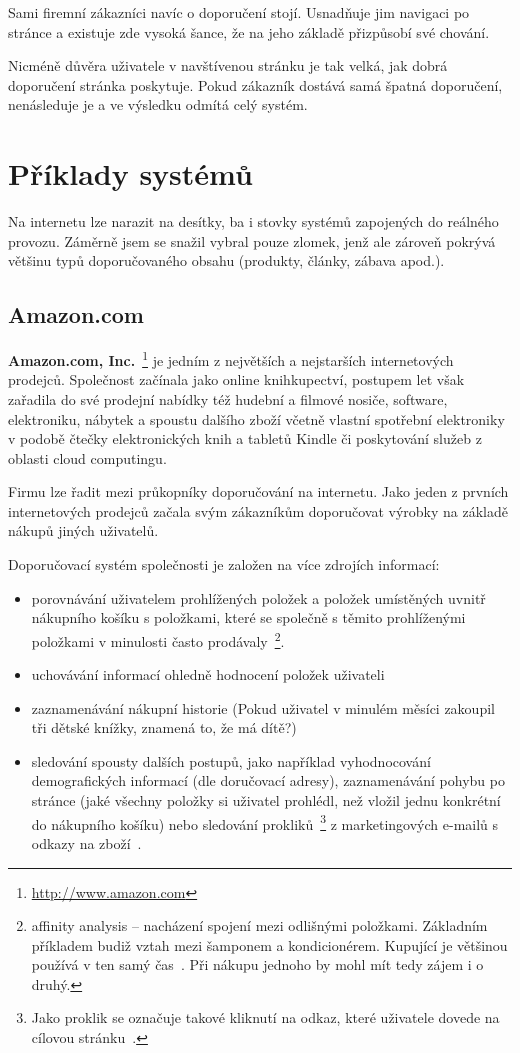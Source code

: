 \documentclass[thesis=M,czech]{FITthesis}[2014/05/07]
\begin{document}
Sami firemní zákazníci navíc o doporučení stojí. Usnadňuje jim navigaci po stránce a existuje zde vysoká šance, že na jeho základě přizpůsobí své chování.

Nicméně důvěra uživatele v navštívenou stránku je tak velká, jak dobrá doporučení stránka poskytuje. Pokud zákazník dostává samá špatná doporučení, nenásleduje je a ve výsledku odmítá celý systém.

\section{Příklady systémů}
\label{sec:examples}
Na internetu lze narazit na desítky, ba i stovky systémů zapojených do reálného provozu. Záměrně jsem se snažil vybral pouze zlomek, jenž ale zároveň pokrývá většinu typů doporučovaného obsahu (produkty, články, zábava apod.).

\subsection{Amazon.com}

\textbf{Amazon.com, Inc.}~\footnote{\url{http://www.amazon.com}} je jedním z největších a nejstarších internetových prodejců. Společnost začínala jako online knihkupectví, postupem let však zařadila do své prodejní nabídky též hudební a filmové nosiče, software, elektroniku, nábytek a spoustu dalšího zboží včetně vlastní spotřební elektroniky v podobě čtečky elektronických knih a tabletů Kindle či poskytování služeb z oblasti cloud computingu.

Firmu lze řadit mezi průkopníky doporučování na internetu. Jako jeden z prvních internetových prodejců začala svým zákazníkům doporučovat výrobky na základě nákupů jiných uživatelů.

Doporučovací systém společnosti je založen na více zdrojích informací:

\begin{itemize}
	\item porovnávání uživatelem prohlížených položek a položek umístěných uvnitř nákupního košíku s položkami, které se společně s těmito prohlíženými položkami v minulosti často prodávaly~\footnote{affinity analysis – nacházení spojení mezi odlišnými položkami. Základním příkladem budiž vztah mezi šamponem a kondicionérem. Kupující je většinou používá v ten samý čas~\cite{affinity}. Při nákupu jednoho by mohl mít tedy zájem i o druhý.}.
	\item uchovávání informací ohledně hodnocení položek uživateli
	\item zaznamenávání nákupní historie (Pokud uživatel v minulém měsíci zakoupil tři dětské knížky, znamená to, že má dítě?)
	\item sledování spousty dalších postupů, jako například vyhodnocování demografických informací (dle doručovací adresy), zaznamenávání pohybu po stránce (jaké všechny položky si uživatel prohlédl, než vložil jednu konkrétní do nákupního košíku) nebo sledování prokliků~\footnote{Jako proklik se označuje takové kliknutí na odkaz, které uživatele dovede na cílovou stránku~\cite{proklik}.} z marketingových e-mailů s odkazy na zboží~\cite{amazonrec}.
\end{itemize}
\end{document}
